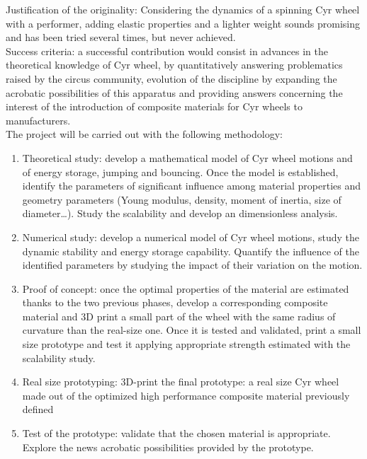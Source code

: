 Justification of the originality: Considering the dynamics of a spinning Cyr wheel with a performer, adding elastic properties and a lighter weight sounds promising and has been tried several times, but never achieved.\\
Success criteria: a successful contribution would consist in advances in the theoretical knowledge of Cyr wheel, by quantitatively answering problematics raised by the circus community, evolution of the discipline by expanding the acrobatic possibilities of this apparatus and providing answers concerning the interest of the introduction of composite materials for Cyr wheels to manufacturers.\\

The project will be carried out with the following methodology:

\begin{enumerate}
\item Theoretical study:
develop a mathematical model of Cyr wheel motions and of energy storage, jumping and bouncing. Once the model is established, identify the parameters of significant influence among material properties and geometry parameters (Young modulus, density, moment of inertia, size of diameter…). Study the scalability and develop an dimensionless analysis.

\item Numerical study:
develop a numerical model of Cyr wheel motions, study the dynamic stability and energy storage capability. Quantify the influence of the identified parameters by studying the impact of their variation on the motion.

\item Proof of concept:
once the optimal properties of the material are estimated thanks to the two previous phases, develop a corresponding composite material and 3D print a small part of the wheel with the same radius of curvature than the real-size one. Once it is tested and validated, print a small size prototype and test it applying appropriate strength estimated with the scalability study.

\item Real size prototyping:
3D-print the final prototype: a real size Cyr wheel made out of the optimized high performance composite material previously defined

\item Test of the prototype:
validate that the chosen material is appropriate.
Explore the news acrobatic possibilities provided by the prototype.

\end{enumerate}


